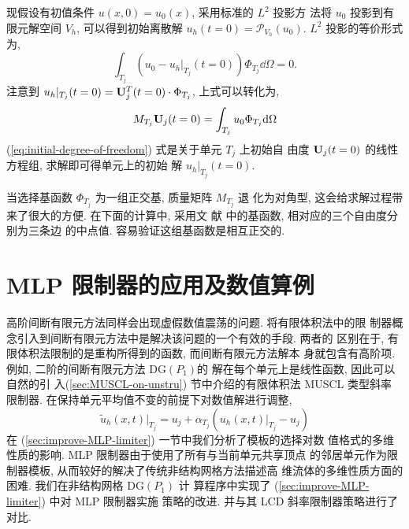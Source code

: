 现假设有初值条件 $u(x, 0) = u_{0}(x)$, 采用标准的 $L^{2}$ 投影方
法将 $u_{0}$ 投影到有限元解空间 $V_{h}$, 可以得到初始离散解
$u_{h}(t=0) = \mathcal{P}_{V_{h}}(u_{0})$. $L^{2}$ 投影的等价形式
为,
\begin{equation}
  \label{eq:L2-projection}
  \int_{T_{j}} \left( u_{0} - u_{h}|_{T_{j}}(t=0) \right) \Phi_{T_{j}}
  \dd \Omega = 0.
\end{equation}
注意到 $u_{h}|_{T_{j}}(t=0) = {\bf{U}}_{j}^{T}(t=0) \cdot
\Phi_{T_{j}}$, 上式可以转化为,
\begin{equation}
  \label{eq:initial-degree-of-freedom}
  M_{T_{j}} {\bf{U}}_{j}(t=0) = \int_{T_{j}} u_{0} \Phi_{T_{j}}
  \mathrm{d} \Omega
\end{equation}
(\ref{eq:initial-degree-of-freedom}) 式是关于单元 $T_{j}$ 上初始自
由度 ${\bf{U}}_{j}(t=0)$ 的线性方程组, 求解即可得单元上的初始
解 $u_{h}|_{T_{j}}(t=0)$.

当选择基函数 $\Phi_{T_{j}}$ 为一组正交基, 质量矩阵 $M_{T_{j}}$ 退
化为对角型, 这会给求解过程带来了很大的方便. 在下面的计算中, 采用文
献 \cite{Cockburn1998} 中的基函数, 相对应的三个自由度分别为三条边
的中点值. 容易验证这组基函数是相互正交的.

\section{MLP 限制器的应用及数值算例}
\label{sec:mlp-apply}

高阶间断有限元方法同样会出现虚假数值震荡的问题. 将有限体积法中的限
制器概念引入到间断有限元方法中是解决该问题的一个有效的手段. 两者的
区别在于, 有限体积法限制的是重构所得到的函数, 而间断有限元方法解本
身就包含有高阶项. 例如, 二阶的间断有限元方法 $\mbox{DG}(P_{1})$的
解在每个单元上是线性函数, 因此可以自然的引
入(\ref{sec:MUSCL-on-unstru}) 节中介绍的有限体积法 MUSCL 类型斜率
限制器. 在保持单元平均值不变的前提下对数值解进行调整,
\begin{equation}
  \label{eq:MUSCL-DG}
  \tilde{u}_{h} (x,t) |_{T_{j}} = u_{j} + \alpha_{T_{j}}\left(
    u_{h}(x,t) |_{T_{j}} - u_{j} \right)
\end{equation}
在 (\ref{sec:improve-MLP-limiter}) 一节中我们分析了模板的选择对数
值格式的多维性质的影响. MLP 限制器由于使用了所有与当前单元共享顶点
的邻居单元作为限制器模板, 从而较好的解决了传统非结构网格方法描述高
维流体的多维性质方面的困难. 我们在非结构网格 $\mbox{DG}(P_{1})$ 计
算程序中实现了 (\ref{sec:improve-MLP-limiter}) 中对 MLP 限制器实施
策略的改进. 并与其 LCD 斜率限制器策略进行了对比.

